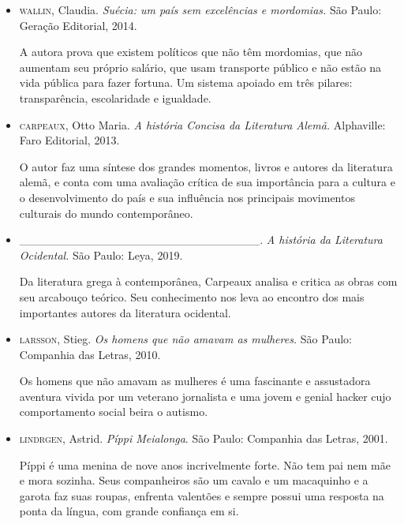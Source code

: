 \documentclass[12pt]{extarticle}
\begin{document}
\begin{itemize}
\item\textsc{wallin}, Claudia. \textit{Suécia: um país sem excelências e mordomias.}
São Paulo: Geração Editorial, 2014.

A autora prova que existem políticos que não têm mordomias, que não
aumentam seu próprio salário, que usam transporte público e não estão na
vida pública para fazer fortuna. Um sistema apoiado em três pilares:
transparência, escolaridade e igualdade.

\item\textsc{carpeaux}, Otto Maria. \textit{A história Concisa da Literatura Alemã.}
Alphaville: Faro Editorial, 2013.

O autor faz uma síntese dos grandes momentos, livros e autores da
literatura alemã, e conta com uma avaliação crítica de sua importância
para a cultura e o desenvolvimento do país e sua influência nos
principais movimentos culturais do mundo contemporâneo.

\item_____________________________. \textit{A história da Literatura Ocidental.} São
Paulo: Leya, 2019.

Da literatura grega à contemporânea, Carpeaux analisa e critica as obras
com seu arcabouço teórico. Seu conhecimento nos leva ao encontro dos
mais importantes autores da literatura ocidental.

\item\textsc{larsson}, Stieg. \textit{Os homens que não amavam as mulheres.} São
Paulo: Companhia das Letras, 2010.

Os homens que não amavam as mulheres é uma fascinante e assustadora
aventura vivida por um veterano jornalista e uma jovem e genial hacker
cujo comportamento social beira o autismo.

\item\textsc{lindrgen}, Astrid. \textit{Píppi Meialonga}. São Paulo: Companhia das
Letras, 2001.

Píppi é uma menina de nove anos incrivelmente forte. Não tem pai nem mãe
e mora sozinha. Seus companheiros são um cavalo e um macaquinho e a
garota faz suas roupas, enfrenta valentões e sempre possui uma resposta
na ponta da língua, com grande confiança em si.
\end{itemize}
\end{document}

